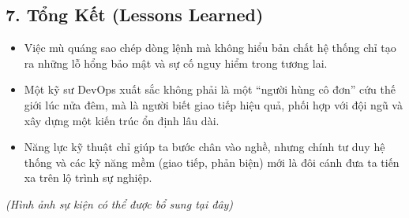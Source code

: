 \hypertarget{tux1ed5ng-kux1ebft-lessons-learned}{%
\subsection{7. Tổng Kết (Lessons
Learned)}}

\begin{itemize}
\tightlist
\item
  Việc mù quáng sao chép dòng lệnh mà không hiểu bản chất hệ thống chỉ
  tạo ra những lỗ hổng bảo mật và sự cố nguy hiểm trong tương lai.
\item
  Một kỹ sư DevOps xuất sắc không phải là một ``người hùng cô đơn'' cứu
  thế giới lúc nửa đêm, mà là người biết giao tiếp hiệu quả, phối hợp
  với đội ngũ và xây dựng một kiến trúc ổn định lâu dài.
\item
  Năng lực kỹ thuật chỉ giúp ta bước chân vào nghề, nhưng chính tư duy
  hệ thống và các kỹ năng mềm (giao tiếp, phản biện) mới là đôi cánh đưa
  ta tiến xa trên lộ trình sự nghiệp.
\end{itemize}

\emph{(Hình ảnh sự kiện có thể được bổ sung tại đây)}
